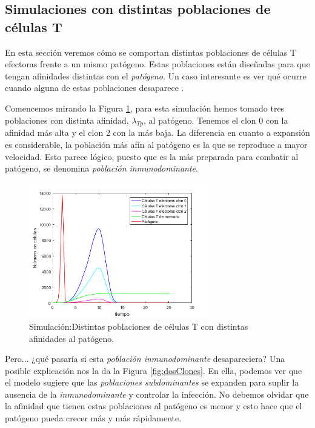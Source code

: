 \subsection{Simulaciones con distintas poblaciones de células T}

En esta sección veremos cómo se comportan distintas poblaciones de células T efectoras frente a un mismo patógeno. Estas poblaciones están diseñadas para que tengan afinidades distintas con el \textit{patógeno}. Un caso interesante es ver qué ocurre cuando alguna de estas poblaciones desaparece . 

Comencemos mirando la Figura \ref{fig:tresClones}, para esta simulación hemos tomado tres poblaciones con distinta afinidad, $\lambda_{Tp}$, al patógeno. Tenemos el clon 0 con la afinidad más alta y el clon 2 con la más baja. La diferencia en cuanto a expansión es considerable, la población más afín al patógeno es la que se reproduce a mayor velocidad. Esto parece lógico, puesto que es la más preparada para combatir al patógeno, se denomina \textit{población inmunodominante}.

\begin{figure}[t]
	\centering
	\includegraphics[width=0.7\textwidth]{Imagenes/Simulaciones/tresClones}
	\caption{Simulación:Distintas poblaciones de células T con distintas afinidades al patógeno.}
	\label{fig:tresClones}
\end{figure}


Pero... ¿qué pasaría si esta \textit{población inmunodominante} desapareciera? Una posible explicación nos la da la Figura \ref{fig:dosClones}. En ella, podemos ver que el modelo sugiere que las \textit{poblaciones subdominantes} se expanden para suplir la ausencia de la \textit{inmunodominante} y controlar la infección. No debemos olvidar que la afinidad que tienen estas poblaciones al patógeno es menor y esto hace que el patógeno pueda crecer más y más rápidamente. 


